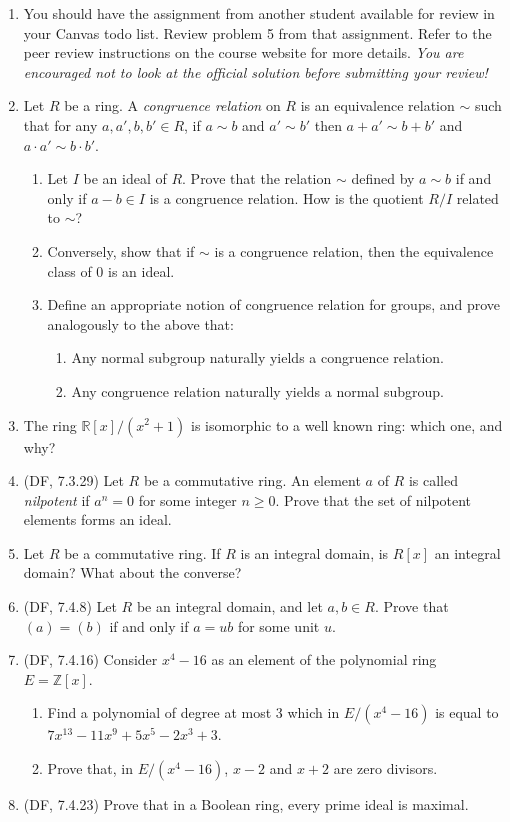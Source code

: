 \documentclass{amsart}
\theoremstyle{definition}
\newcommand{\Zz}{\mathbb{Z}}
\newcommand{\Rr}{\mathbb{R}}
\begin{document}
\begin{enumerate}
\item You should have the assignment from another student available for review in your Canvas todo list. Review problem 5 from that assignment. Refer to the peer review instructions on the course website for more details. \emph{You are encouraged not to look at the official solution before submitting your review!}
\item Let $R$ be a ring. A \emph{congruence relation} on $R$ is an equivalence relation $\sim$ such that for any $a, a', b, b' \in R$, if $a \sim b$ and $a' \sim b'$ then $a + a' \sim b + b'$ and $a \cdot a' \sim b \cdot b'$.

  \begin{enumerate}
  \item Let $I$ be an ideal of $R$. Prove that the relation $\sim$ defined by $a \sim b$ if and only if $a - b \in I$ is a congruence relation. How is the quotient $R / I$ related to $\sim$?  
  \item Conversely, show that if $\sim$ is a congruence relation, then the equivalence class of $0$ is an ideal.
  \item Define an appropriate notion of congruence relation for groups, and prove analogously to the above that:
    \begin{enumerate}
    \item Any normal subgroup naturally yields a congruence relation.
    \item Any congruence relation naturally yields a normal subgroup.
    \end{enumerate}
  \end{enumerate}
\item The ring $\Rr[x] / (x^2 + 1)$ is isomorphic to a well known ring: which one, and why?

\item (DF, 7.3.29) Let $R$ be a commutative ring. An element $a$ of $R$ is called \emph{nilpotent} if $a^n = 0$ for some integer $n \ge 0$. Prove that the set of nilpotent elements forms an ideal.
\item Let $R$ be a commutative ring. If $R$ is an integral domain, is $R[x]$ an integral domain? What about the converse?

\item (DF, 7.4.8) Let $R$ be an integral domain, and let $a, b \in R$. Prove that $(a) = (b)$ if and only if $a = ub$ for some unit $u$. 
\item (DF, 7.4.16) Consider $x^4 - 16$ as an element of the polynomial ring $E = \Zz[x]$. 
  \begin{enumerate}
  \item Find a polynomial of degree at most 3 which in $E / (x^4 - 16)$ is equal to $7x^{13} -11 x^9 + 5x^5 - 2x^3 + 3$.
  \item Prove that, in $E / (x^4 - 16)$, $x - 2$ and $x + 2$ are zero divisors.
  \end{enumerate}
  \item (DF, 7.4.23) Prove that in a Boolean ring, every prime ideal is maximal.  
\end{enumerate}
\end{document}
